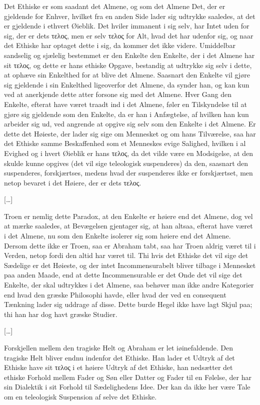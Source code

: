 \documentclass[12pt,a4paper]{article}
\begin{document}
Det Ethiske er som saadant det Almene, og som det Almene Det, der er gjeldende for Enhver, hvilket fra en anden Side lader sig udtrykke saaledes, at det er gjeldende i ethvert Øieblik. Det hviler immanent i sig selv, har Intet uden for sig, der er dets τελος, men er selv τελος for Alt, hvad det har udenfor sig, og naar det Ethiske har optaget dette i sig, da kommer det ikke videre. Umiddelbar sandselig og sjælelig bestemmet er den Enkelte den Enkelte, der i det Almene har sit τελος, og dette er hans ethiske Opgave, bestandig at udtrykke sig selv i dette, at ophæve sin Enkelthed for at blive det Almene. Saasnart den Enkelte vil gjøre sig gjeldende i sin Enkelthed ligeoverfor det Almene, da synder han, og kan kun ved at anerkjende dette atter forsone sig med det Almene. Hver Gang den Enkelte, efterat have været traadt ind i det Almene, føler en Tilskyndelse til at gjøre sig gjeldende som den Enkelte, da er han i Anfægtelse, af hvilken han kun arbeider sig ud, ved angrende at opgive sig selv som den Enkelte i det Almene. Er dette det Høieste, der lader sig sige om Mennesket og om hans Tilværelse, saa har det Ethiske samme Beskaffenhed som et Menneskes evige Salighed, hvilken i al Evighed og i hvert Øieblik er hans τελος, da det vilde være en Modsigelse, at den skulde kunne opgives (det vil sige teleologisk suspenderes) da den, saasnart den suspenderes, forskjærtses, medens hvad der suspenderes ikke er forskjærtset, men netop bevaret i det Høiere, der er dets τελος.

[…]

Troen er nemlig dette Paradox, at den Enkelte er høiere end det Almene, dog vel at mærke saaledes, at Bevægelsen gjentager sig, at han altsaa, efterat have været i det Almene, nu som den Enkelte isolerer sig som høiere end det Almene. Dersom dette ikke er Troen, saa er Abraham tabt, saa har Troen aldrig været til i Verden, netop fordi den altid har været til. Thi hvis det Ethiske det vil sige det Sædelige er det Høieste, og der intet Incommensurabelt bliver tilbage i Mennesket paa anden Maade, end at dette Incommensurable er det Onde det vil sige det Enkelte, der skal udtrykkes i det Almene, saa behøver man ikke andre Kategorier end hvad den græske Philosophi havde, eller hvad der ved en consequent Tænkning lader sig uddrage af disse. Dette burde Hegel ikke have lagt Skjul paa; thi han har dog havt græske Studier.

[…]

Forskjellen mellem den tragiske Helt og Abraham er let iøinefaldende. Den tragiske Helt bliver endnu indenfor det Ethiske. Han lader et Udtryk af det Ethiske have sit τελος i et høiere Udtryk af det Ethiske, han nedsætter det ethiske Forhold mellem Fader og Søn eller Datter og Fader til en Følelse, der har sin Dialektik i sit Forhold til Sædelighedens Idee. Der kan da ikke her være Tale om en teleologisk Suspension af selve det Ethiske.
\end{document}
